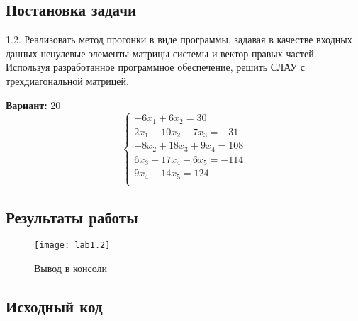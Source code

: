 \subsection{Постановка задачи}
1.2. Реализовать метод прогонки в виде программы, задавая в качестве входных данных ненулевые элементы матрицы системы и вектор правых частей. Используя разработанное программное обеспечение, решить СЛАУ с трехдиагональной матрицей. 

{\bfseries Вариант:} 20
\begin{equation}
        \left\{ 
        \begin{array}{ll} 
        -6x_1 + 6x_2 = 30 \\
        2x_1 + 10x_2 - 7x_3 = -31\\
        -8x_2 + 18x_3 + 9x_4 = 108\\
        6x_3 - 17x_4 - 6x_5 = -114\\
        9x_4 + 14x_5 = 124\\
        \end{array}\right.
\end{equation}
\pagebreak

\subsection{Результаты работы}

\begin{figure}[h!]
\centering
\texttt{[image: lab1.2]}
\caption{Вывод в консоли}
\end{figure}
\pagebreak

\vfill

\subsection{Исходный код}


\pagebreak